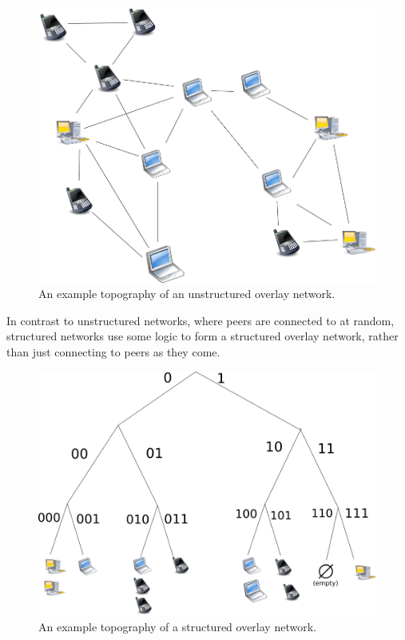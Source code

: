 \begin{figure}
	\includegraphics[width=\textwidth]{pictures/unstructured.png}
	\caption{An example topography of an unstructured overlay network.}
	\label{Unstructured Overlay Network}
\end{figure}

In contrast to unstructured networks, where peers are connected to at random, structured networks use some logic to form a structured overlay network, rather than just connecting to peers as they come.

\begin{figure}
	\includegraphics[width=\textwidth]{pictures/structured.png}
	\caption{An example topography of a structured overlay network.}
	\label{Structured Overlay Network}
\end{figure}

